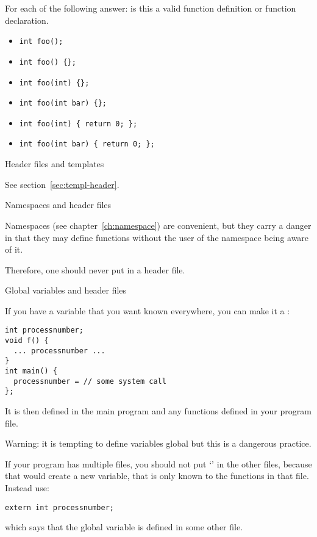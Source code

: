 \begin{review}
  \label{rev:proto-c-cpp}
  For each of the following answer: is this a valid function
  definition or function declaration.
  \begin{itemize}
  \item \verb+int foo();+
  \item \verb+int foo() {};+
  \item \verb+int foo(int) {};+
  \item \verb+int foo(int bar) {};+
  \item \verb+int foo(int) { return 0; };+
  \item \verb+int foo(int bar) { return 0; };+
  \end{itemize}
\end{review}

 {Header files and templates}

See section~\ref{sec:templ-header}.

 {Namespaces and header files}
\label{sec:namespace-header}

Namespaces
(see chapter~\ref{ch:namespace})
are convenient, but they carry a danger in that they may define
functions without the user of the namespace being aware of it.

Therefore, one should never put  in a header
file.

 {Global variables and header files}
\label{ex:globalvar}

If you have a variable that you want known everywhere, you can make it
a :
\begin{lstlisting}
int processnumber;
void f() {
  ... processnumber ...
}
int main() {
  processnumber = // some system call
};
\end{lstlisting}
It is then defined in the main program and any functions defined in your program file.

Warning: it is tempting to define variables global but this is a
dangerous practice.

If your program has multiple files, you should not put `'
in the other files, because that would create a new variable, that is
only known to the functions in that file. Instead use:
\begin{lstlisting}
extern int processnumber;
\end{lstlisting}
which says that the global variable  is defined in
some other file.

